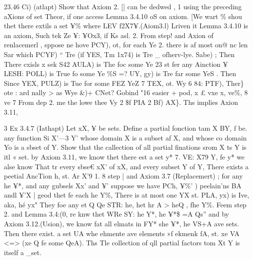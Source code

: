 \documentclass[a4paper,12pt]{article}
\begin{document}
\vspace{10pt}

\par

\vspace{10pt}

    23.46 Ci) (atlapt)  Show that Axiom 2. [| can be dedwed , 1 using the preceding aXions of set Theor,  if one access Lemma 3.4.10 oS on axiom.    [We wart \% shou thet there extils a set ¥\% where LEV f2X7¥.(Aiom3.l)  Lriven it Lemma 3.4.10 is an axiom,  Such tek Ze ¥: ¥Ox3, if Ks asl.    2. From step! and Axion of renlacemerl , sppose ne hove PCY), ot,  for each Ye 2. there is af most on@ nc len Sar which PCYF) “ Tre  (if YES, Tm 1x74) is Tre \_ ofherv-lye. Sabe) ;    Then There cxisls x sek S42 AULA) is The foc some Ye 23 st  fer any Ainction ¥   LESH: POLL) is True fo some Ye \%S   =? UY, gy) is Tre far some YeS .    Then Since YEX, PULZ) is Tue for some FEZ  YeZ 7 TEX, ot. Wy 6 84: PTF), Ther\}    ote : ard nally > as Wye \&)+  CNet? Gobind "16 easier + pod, x £ vxe x, ve\%, 8 ve    7 From dep 2. me the lowe thee Vy 2 \$f PIA 2 Bf) AX\}.  Ths implies Axion 3.11, 

\vspace{10pt}

\par

\vspace{10pt}

    3    Ex 3.4.7 (Iathapt)   Let xX, ¥ be sets. Define a partial fonction tam X BY, f be.  any function Si X'—3 Y' whose domain X is a subset af X,   and whose co domain Yo is a sbset of Y.    Show that the callection of all partial finations srom X ts Y is itl « set.    by Axiom 3.11, we know thet there est a set y* 7. VE: X79 Y, fe y*  we alse know That tr every sbse€ xX’ of xX, and every subset Y of Y,  There exists a peetial AncTion h, st. Ar X'9 1.    8 step | and Axiom 3.7 (Replacemert) ; for any he ¥*, and any gubsels Xx’ and ¥'  suppose we have PCh, ¥\%' ) peelain’ns BA andl ¥'X |   geod thet fe each he Y\%, There is at most one YX st.   PLA, yx) is Ive, aka, hé yx"    They foe any et Q Qe STR: he, het hr A  > heQ , fhe Y\%.    Feem step 2. and Lemma 3.4:(0, re knw thet WRe SY: he Y*, he ¥*\$ =A  Qs”   and by Axiom 3.12.(Usion), we know fat all elmats in FY* she ¥*, he VS+A   ave sets.   Then there exist. a set UA whe ehmente ave elements »f ekmenk fA,    st. xe VA <=> (xe Q fe some QeA).  Ths Tle collection of qll partial factors tom Xt Y is itself a \_set. 
\end{document}
